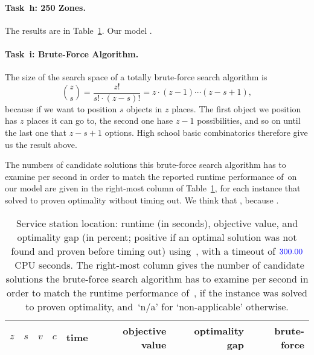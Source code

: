\paragraph{Task~h: 250 Zones.}
The results are in Table~\ref{tab:res:mip}.
%
Our model .

\paragraph{Task~i: Brute-Force Algorithm.}
The size of the search space of a totally brute-force search algorithm
is 
\begin{equation*}
\binom{z}{s} = \frac{z!}{s! \cdot (z-s)!}  = z \cdot (z-1) \cdots (z-s+1),
\end{equation*}
because if we want to position $s$ objects in $z$ places. The first object we position has $z$ places it can go to, the second one hase $z-1$ possibilities, and so on until the last one that $z - s + 1$ options. High school basic combinatorics therefore give us the result above.

The numbers of candidate solutions this brute-force search algorithm
has to examine per second in order to match the reported runtime
performance of~\SolverMIP on our model are given in the right-most
column of Table~\ref{tab:res:mip}, for each instance that~\SolverMIP
solved to proven optimality without timing out.
%
We think that \todo{\filler}, because \todo{\filler}.

\begin{table}[t]  %
  \centering
  \begin{tabular}{rrrrrrrr}  %
    $z$ & $s$ & $v$ & $c$ & time & objective value & optimality gap & brute-force \\
    \midrule
  \end{tabular}
  \caption{Service station location: runtime (in seconds), objective
    value, and optimality gap (in percent; positive if an optimal
    solution was not found and proven before timing out)
    using~\SolverMIP, with a timeout of ${\color{blue}300.00}$~CPU seconds.
    The right-most column gives the number of candidate solutions the
    brute-force search algorithm has to examine per second in order to
    match the runtime performance of~\SolverMIP, if the instance was
    solved to proven optimality, and~`n/a' for `non-applicable'
    otherwise.
  }
  \label{tab:res:mip}
\end{table}

